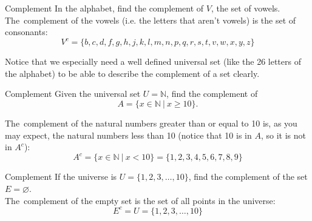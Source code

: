 \begin{example}[https://www.youtube.com/watch?v=6ZaKLBWs0pQ]{Complement}
In the alphabet, find the complement of $V$, the set of vowels.\\

The\sol\ complement of the vowels (i.e. the letters that aren't vowels) is the set of consonants:
\[V^c = \{b,c,d,f,g,h,j,k,l,m,n,p,q,r,s,t,v,w,x,y,z\}\]

Notice that we especially need a well defined universal set (like the 26 letters of the alphabet) to be able to describe the complement of a set clearly.
\end{example}

\begin{example}[https://www.youtube.com/watch?v=xuF80sH5nE4]{Complement}
Given the universal set $U = \mathbb{N}$, find the complement of \[A = \{x \in \mathbb{N}\ |\ x \geq 10\}.\]

The\sol\ complement of the natural numbers greater than or equal to 10 is, as you may expect, the natural numbers less than 10 (notice that 10 is in $A$, so it is not in $A^c$):
\[A^c = \{x \in \mathbb{N}\ |\ x < 10\} = \{1,2,3,4,5,6,7,8,9\}\]
\end{example}

\begin{example}[https://www.youtube.com/watch?v=CQkDnkSmXag]{Complement}
If the universe is $U = \{1,2,3,\ldots,10\}$, find the complement of the set $E=\varnothing$.\\

The\sol\ complement of the empty set is the set of all points in the universe:
\[E^c = U = \{1,2,3,\ldots,10\}\]
\end{example}
\pagebreak

